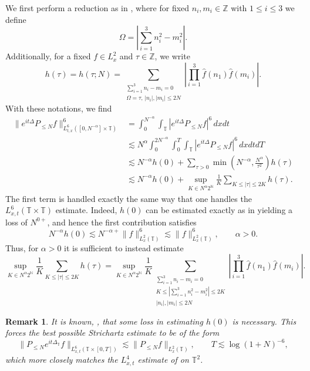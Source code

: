 \documentclass[12pt, letterpaper]{amsart}
\newtheorem{remark}{Remark}
\begin{document}
We first perform a reduction as in \cite{herr2023strichartz}, where for fixed $n_i,m_i\in\mathbb{Z}$ with $1\leq i\leq 3$ we define 
\[
\Omega = \left|\sum_{i=1}^3n_i^2-m_i^2\right|.
\]
Additionally, for a fixed $f\in L^2_x$ and $\tau\in\mathbb{Z}$, we write
\[
h(\tau) = h(\tau; N) = \sum_{\substack{\sum_{i=1}^3n_i-m_i=0\\\Omega = \tau,\,|n_i|,|m_i|\leq 2N}}\left|\prod_{i=1}^3\widehat{f}(n_1)\widehat{f}(m_i)\right|.
\]
With these notations, we find
\begin{align*}
    \|e^{it\Delta}P_{\leq N}f\|^6_{L^6_{t,x}([0,N^{-\alpha}]\times\mathbb{T})} & = \int_0^{N^{-\alpha}}\int_\mathbb{T}|e^{it\Delta}P_{\leq N}f|^6\,dxdt\\
    &\lesssim N^{\alpha}\int_0^{2N^{-\alpha}}\int_0^{T}\int_\mathbb{T}|e^{it\Delta}P_{\leq N}f|^6\,dxdtdT\\
    &\lesssim N^{-\alpha}h(0) + \sum_{\tau > 0}\min\left(N^{-\alpha}, \frac{N^\alpha}{\tau^2}\right)h(\tau)\\
    &\lesssim N^{-\alpha}h(0) + \sup_{K\in N^\alpha2^\mathbb{N}}\frac{1}{K}\sum_{K\leq |\tau|\leq 2K}h(\tau).
\end{align*}
The first term is handled exactly the same way that one handles the $L^6_{x,t}(\mathbb{T}\times\mathbb{T})$ estimate. Indeed, $h(0)$ can be estimated exactly as in \cite[Proposition 2.36]{Bour1} yielding a loss of $N^{0+}$, and hence the first contribution satisfies
\[
N^{-\alpha}h(0)\lesssim N^{-\alpha+}\|f\|_{L^2_x(\mathbb{T})}^6\lesssim \|f\|_{L^2_x(\mathbb{T})}^6,\qquad \alpha > 0.
\]
Thus, for $\alpha > 0$ it is sufficient to instead estimate
\[
\sup_{K\in N^\alpha2^\mathbb{N}}\frac{1}{K}\sum_{K\leq |\tau|\leq 2K}h(\tau) = \sup_{K\in N^\alpha2^\mathbb{N}}\frac{1}{K}\sum_{\substack{\sum_{i=1}^3n_i-m_i=0\\K\leq |\sum_{i=1}^3n_i^2-m_i^2|\leq 2K\\|n_i|,|m_i|\leq 2N}}\left|\prod_{i=1}^3\widehat{f}(n_1)\widehat{f}(m_i)\right|.
\]
\begin{remark}
    It is known, \cite[Remark 2]{Bour1}, that some loss in estimating $h(0)$ is necessary. This forces the best possible Strichartz estimate to be of the form
    \[
        \|P_{\leq N} e^{it\Delta_\mathbb{T}}f\|_{L^6_{x,t}(\mathbb{T}\times [0,T])}\lesssim \|P_{\leq N}f\|_{L^2_{x}(\mathbb{T})},\qquad T\lesssim \log(1+N)^{-6},
    \]
    which more closely matches the $L^4_{x,t}$ estimate of \cite{herr2023strichartz} on $\mathbb{T}^2$.
\end{remark}
\end{document}
